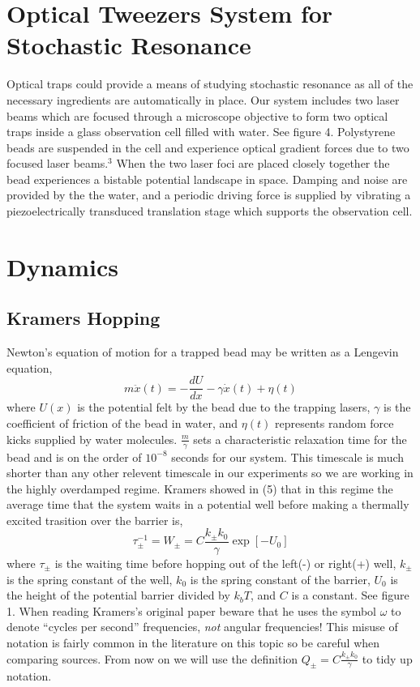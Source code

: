 \documentclass{report}
\begin{document}
\section{Optical Tweezers System for Stochastic Resonance}

Optical traps could provide a means of studying stochastic resonance as all of the necessary ingredients are automatically in place. Our system includes two laser beams which are focused through a microscope objective to form two optical traps inside a glass observation cell filled with water. See figure 4. Polystyrene beads are suspended in the cell and experience optical gradient forces due to two focused laser beams.$^3$ When the two laser foci are placed closely together the bead experiences a bistable potential landscape in space. Damping and noise are provided by the the water, and a periodic driving force is supplied by vibrating a piezoelectrically transduced translation stage which supports the observation cell.

\section{Dynamics}

\subsection{Kramers Hopping}
Newton's equation of motion for a trapped bead may be written as a Lengevin equation,
\begin{displaymath}
m\ddot{x}(t) = -\frac{dU}{dx} - \gamma \dot{x}(t) + \eta(t)
\end{displaymath}
where $U(x)$ is the potential felt by the bead due to the trapping lasers, $\gamma$ is the coefficient of friction of the bead in water, and $\eta(t)$ represents random force kicks supplied by water molecules. $\frac{m}{\gamma}$ sets a characteristic relaxation time for the bead and is on the order of $10^{-8}$ seconds for our system. This timescale is much shorter than any other relevent timescale in our experiments so we are working in the highly overdamped regime. Kramers showed in (5) that in this regime the average time that the system waits in a potential well before making a thermally excited trasition over the barrier is,
\begin{displaymath}
\tau_{\pm}^{-1} = W_{\pm} = C \frac{k_{\pm}k_0}{\gamma} \exp \left[-U_0 \right]
\end{displaymath}
where $\tau_{\pm}$ is the waiting time before hopping out of the left(-) or right(+) well, $k_{\pm}$ is the spring constant of the well, $k_0$ is the spring constant of the barrier, $U_0$ is the height of the potential barrier divided by $k_bT$, and $C$ is a constant. See figure 1. When reading Kramers's original paper beware that he uses the symbol $\omega$ to denote ``cycles per second'' frequencies, \emph{not} angular frequencies! This misuse of notation is fairly common in the literature on this topic so be careful when comparing sources. From now on we will use the definition $Q_{\pm} = C \frac{k_{\pm}k_0}{\gamma}$ to tidy up notation.
\end{document}
